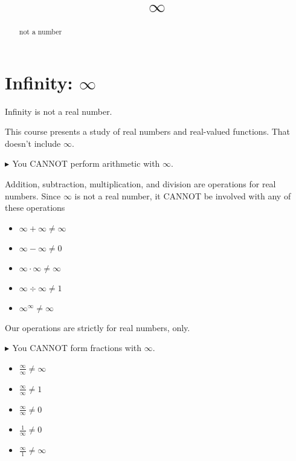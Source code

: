 \documentclass{ximera}
\title{$\infty$}
\begin{document}
\begin{abstract}
not a number
\end{abstract}
\maketitle




\section{Infinity: $\infty$}


\begin{center}
Infinity is not a real number.
\end{center}




This course presents a study of real numbers and real-valued functions. That doesn't include $\infty$.




\textbf{\textcolor{red!90!darkgray}{$\blacktriangleright$ }} You CANNOT perform arithmetic with $\infty$.

Addition, subtraction, multiplication, and division are operations for real numbers.  Since $\infty$ is not a real number, it CANNOT be involved with any of these operations


\begin{example}


\begin{itemize}
\item $\infty + \infty \ne \infty$
\item $\infty - \infty \ne 0$
\item $\infty \cdot \infty \ne \infty$
\item $\infty \div \infty \ne 1$
\item $\infty^{\infty} \ne \infty$
\end{itemize}


\end{example}

Our operations are strictly for real numbers, only.









\textbf{\textcolor{red!90!darkgray}{$\blacktriangleright$ }} You CANNOT form fractions with $\infty$.



\begin{example}


\begin{itemize}
\item $\frac{\infty}{\infty} \ne \infty$
\item $\frac{\infty}{\infty} \ne 1$
\item $\frac{\infty}{\infty} \ne 0$
\item $\frac{1}{\infty} \ne 0$
\item $\frac{\infty}{1} \ne \infty$
\end{itemize}


\end{example}
\end{document}
